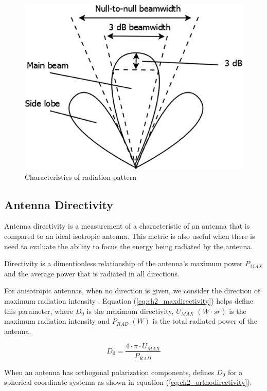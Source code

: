 \begin{figure}[H]
    \vspace*{0cm}
    \centering
    \includegraphics[width=0.5\linewidth]{figs/ch_2_secArray_Beam.jpg}
    \caption{Characteristics of radiation-pattern \cite{Bhattacharyya2020RadiationArrays}}
    \label{fig:ch_2_secArray_Beam}
\end{figure}

\subsection{Antenna Directivity}

\par Antenna directivity is a measurement of a characteristic of an antenna that is compared to an ideal isotropic antenna. This metric is also useful when there is need to evaluate the ability to focus the energy being radiated by the antenna.

\par Directivity is a dimentionless relationship of the antenna's maximum power $P_{MAX}$ and the average power that is radiated in all directions. 

\par For anisotropic antennas, when no direction is given, we consider the direction of maximum radiation intensity \cite{ConstantineA.Balanis2016AntennaDesign}. Equation (\ref{eq:ch2_maxdirectivity}) helps define this parameter, where $D_{0}$ is the maximum directivity, $U_{MAX}\;(W\cdot sr)$ is the maximum radiation intensity and $P_{RAD}\;(W)$ is the total radiated power of the antenna.

\begin{equation}
    \label{eq:ch2_maxdirectivity}
    D_{0}=\frac{4\cdot\pi\cdot U_{MAX}}{P_{RAD}}
\end{equation}

\par When an antenna has orthogonal polarization components, \citeauthor{ConstantineA.Balanis2016AntennaDesign} defines $D_{0}$ for a spherical coordinate systemn as shown in equation (\ref{eq:ch2_orthodirectivity}).

